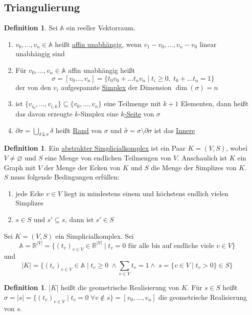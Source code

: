 \documentclass[a4paper, 12pt]{article}
\theoremstyle{plain}
\theoremstyle{definition}
\newtheorem{definition}[theorem]{Definition} %
\theoremstyle{lemma}
\theoremstyle{remark}
\theoremstyle{corollary}
\theoremstyle{example}
\begin{document}
	\subsection{Triangulierung}
	\begin{definition}
		Sei $\mathbb{A}$ ein reeller Vektorraum.
		\begin{enumerate}
			\item $v_0,...,v_n \in \mathbb{A}$ heißt \underline{affin unabhängig}, wenn $v_1-v_0, ..., v_n - v_0$ linear unabhängig sind
			\item Für $v_0,...,v_n \in \mathbb{A}$ affin unabhängig heißt \[\sigma = [v_0...,v_n] = \{t_0v_0 + \dots t_n v_n \mid t_i \geq 0, \; t_0 + \dots t_n = 1\}\] der von den $v_i$ aufgespannte \underline{Simplex} der Dimension $\dim(\sigma) = n$
			\item ist $\{v_{i_0}, ..., v_{i,k}\} \subseteq \{v_0,...,v_n\}$ eine Teilmenge mit $k+1$ Elementen, dann heißt das davon erzeugte $k$-Simplex eine \underline{$k$-Seite} von $\sigma$
			\item $\partial \sigma = \bigcup_{\delta \subsetneqq \sigma} \delta$ heißt \underline{Rand} von $\sigma$ und $\overset{\circ}{\sigma} = \sigma \setminus \partial \sigma$ ist das \underline{Innere}
		\end{enumerate}
	\end{definition}
	\begin{definition}
		Ein \underline{abstrakter Simplicialkomplex} ist ein Paar $K = (V, S)$, wobei $V \neq \varnothing$ und $S$ eine Menge von endlichen Teilmengen von $V$. Anschaulich ist $K$ ein Graph mit $V$ der Menge der Ecken von $K$ und $S$ die Menge der Simplizes von $K$.\\
		$S$ muss folgende Bedingungen erfüllen: \begin{enumerate}
			\item jede Ecke $v \in V$ liegt in mindestens einem und höchstens endlich vielen Simplizes
			\item $s \in S$ und $s'\subseteq s$, dann ist $s' \in S$
		\end{enumerate}
	\end{definition}
	Sei $K = (V,S)$ ein Simplicialkomplex. Sei $$\mathbb{A} = \mathbb{R}^{\left|V\right|} = \{(t_v)_{v \in V} \in \mathbb{R}^{\left|V\right|} \mid t_v = 0 \text{ für alle bis auf endliche viele } v \in V\}$$ und $$\left|K\right| = \{(t_v)_{v \in V} \in \mathbb{A} \mid t_v \geq 0 \; \land \sum_{v \in V} t_v = 1 \land \; s = \{v \in V \mid t_v > 0\} \in S\}$$
	\begin{definition}
		$\left|K\right|$ heißt die geometrische Realisierung von $K$. Für $s \in S$ heißt $\sigma = \left|s\right| = \{(t_v)_{v \in V} \mid t_v = 0 \; \forall v \notin s\} = [v_0,...,v_n]$ die geometrische Realisierung von $s$. 
	\end{definition}
\end{document}
